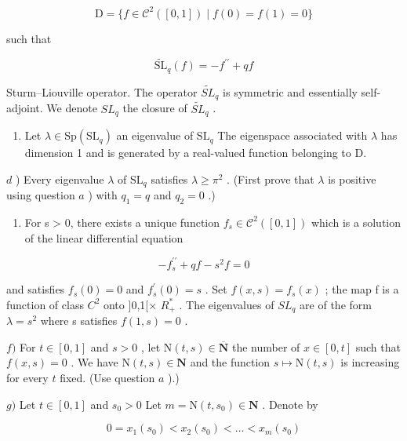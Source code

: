 \[
\mathrm{D} = \{f \in \mathcal {C} ^ {2} ([ 0, 1 ]) \mid f (0) = f (1) = 0 \}
\]

such that

\[
\widetilde {\mathrm{SL}} _ {q} (f) = - f ^ {\prime \prime} + q f
\]

Sturm–Liouville operator. The operator \(\widetilde{SL}_{q}\) is symmetric and essentially self-adjoint. We denote \(SL_{q}\) the closure of \(\widetilde{SL}_{q}\) .

\begin{enumerate}
\def\labelenumi{\alph{enumi})}
\setcounter{enumi}{2}
\tightlist
\item
  Let \(\lambda \in \mathrm{Sp}(\mathrm{SL}_q)\) an eigenvalue of \(\mathrm{SL}_q\) The eigenspace associated with \(\lambda\) has dimension 1 and is generated by a real-valued function belonging to D.
\end{enumerate}

\(d\) ) Every eigenvalue \(\lambda\) of \(\mathrm{SL}_q\) satisfies \(\lambda \geqslant \pi^2\) . (First prove that \(\lambda\) is positive using question \(a\) ) with \(q_{1} = q\) and \(q_{2} = 0\) .)

\begin{enumerate}
\def\labelenumi{\alph{enumi})}
\setcounter{enumi}{4}
\tightlist
\item
  For s \textgreater{} 0, there exists a unique function \(f_{s} \in \mathcal{C}^{2}([0,1])\) which is a solution of the linear differential equation
\end{enumerate}

\[
- f _ {s} ^ {\prime \prime} + q f - s ^ {2} f = 0
\]

and satisfies \(f_{s}(0)=0\) and \(f_{s}^{\prime}(0)=s\) . Set \(f(x,s)=f_{s}(x)\) ; the map f is a function of class \(C^{2}\) onto {]}0,1{[}× \(R_{+}^{*}\) . The eigenvalues of \(SL_{q}\) are of the form \(\lambda=s^{2}\) where s satisfies \(f(1,s)=0\) .

\(f)\) For \(t \in [0,1]\) and \(s > 0\) , let \(\mathrm{N}(t,s) \in \overline{\mathbf{N}}\) the number of \(x \in [0,t]\) such that \(f(x,s) = 0\) . We have \(\mathrm{N}(t,s) \in \mathbf{N}\) and the function \(s \mapsto \mathrm{N}(t,s)\) is increasing for every \(t\) fixed. (Use question \(a\) ).)

\(g)\) Let \(t \in [0,1]\) and \(s_0 > 0\) Let \(m = \mathrm{N}(t,s_0) \in \mathbf{N}\) . Denote by

\[
0 = x _ {1} (s _ {0}) <   x _ {2} (s _ {0}) <   \dots <   x _ {m} (s _ {0})
\]

